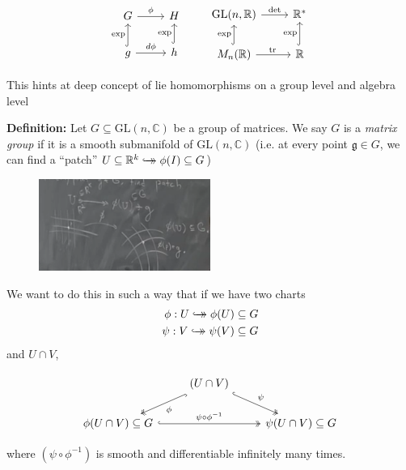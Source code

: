 \documentclass[12pt]{article}
\newcommand{\R}{\mathbb{R}}
\newcommand{\C}{\mathbb{C}}
\newcommand{\GL}{\text{GL}}
\newcommand{\tr}{\text{tr}\,}
\newcommand{\biject}{\hookrightarrow \hspace{-8pt} \rightarrow}
\begin{document}
    \[\begin{tikzcd}
            G \arrow{r}{\phi} & H\\ 
            g \arrow[hookrightarrow]{u}{\exp} \arrow{r}{d\phi} 
            & h \arrow[hookrightarrow]{u}{\exp}
        \end{tikzcd} \qquad 
        \begin{tikzcd}
            \GL(n, \R) \arrow{r}{\det} & \R^*\\
            M_n(\R) \arrow[hookrightarrow]{u}{\exp} \arrow{r}{\tr}  
            & \R \arrow[hookrightarrow]{u}{\exp}
        \end{tikzcd}
    \]

    This hints at deep concept of lie homomorphisms on a group level and algebra level

    \textbf{Definition:} Let $G \subseteq \GL(n, \C)$ be a group of matrices. We say $G$ is a \emph{matrix group} if it is a smooth submanifold of $\GL(n, \C)$ (i.e. at every point $\mathfrak{g} \in G$, we can find a ``patch'' $U \subseteq \R^k \biject \phi(I) \subseteq G$)

    \begin{figure}
        \centering
        \includegraphics[width=0.5\textwidth]{Images/Feb 5 manifold.png}
    \end{figure}

    We want to do this in such a way that if we have two charts 
    \begin{align*}
        \phi: U \biject \phi(U) \subseteq G\\ 
        \psi: V \biject \psi(V) \subseteq G
    \end{align*}
    and $U \cap V$, 
    
    \[\begin{tikzcd}
        & (U \cap V) \arrow[hook, two heads]{dl}{\phi} \arrow[hook, two heads]{dr}{\psi} & \\ 
        \phi(U \cap V) \subseteq G \arrow[hook, two heads]{rr}{\psi \circ \phi^{-1}} 
            & & \psi(U \cap V) \subseteq G
    \end{tikzcd}\]

    where $(\psi \circ \phi^{-1})$ is smooth and differentiable infinitely many times. 
\end{document}
